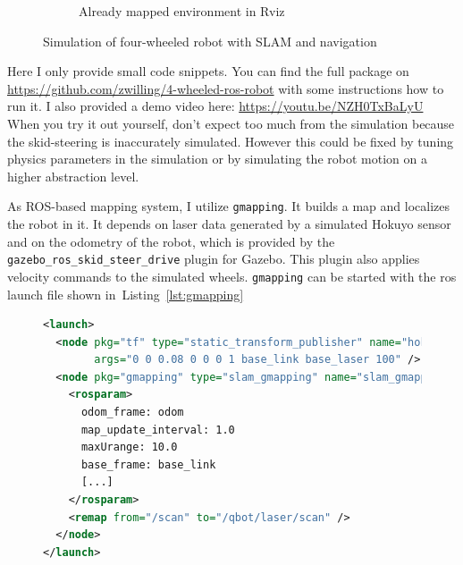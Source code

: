 \documentclass[a4paper,11pt]{article}
\newcommand{\reflst}[1]{Listing~\ref{#1}}
\begin{document}
\begin{figure}
\begin{subfigure}[b]{0.48\textwidth}
    \label{fig:rviz}
    \caption{Already mapped environment in Rviz}
  \end{subfigure}
  \caption{Simulation of four-wheeled robot with SLAM and navigation}
  \label{fig:gaz-rviz}
\end{figure}
Here I only provide small code snippets. You can find the full package
on \url{https://github.com/zwilling/4-wheeled-ros-robot} with some
instructions how to run it. I also provided a demo video
here: \url{https://youtu.be/NZH0TxBaLyU}\\When you try it out yourself, don't expect too much from
the simulation because the skid-steering is
inaccurately simulated. However this could be fixed by tuning physics parameters
in the simulation or by simulating the robot motion on a higher abstraction
level.

As ROS-based mapping system, I utilize \texttt{gmapping}. It builds a map and
localizes the robot in it. It depends on laser data generated by a
simulated Hokuyo sensor and on the odometry of the robot, which is
provided by the \texttt{gazebo\_ros\_skid\_steer\_drive} plugin for
Gazebo. This plugin also applies velocity commands to the simulated
wheels. \texttt{gmapping} can be started with the ros launch file
shown in~\reflst{lst:gmapping}
\begin{figure}
\begin{lstlisting}[showlines,language=XML, caption={Launch file for \texttt{gmapping}},
    label=lst:gmapping]
<launch>
  <node pkg="tf" type="static_transform_publisher" name="hokuyo_link_broadcaster"
        args="0 0 0.08 0 0 0 1 base_link base_laser 100" />
  <node pkg="gmapping" type="slam_gmapping" name="slam_gmapping" output="screen">
    <rosparam>
      odom_frame: odom
      map_update_interval: 1.0
      maxUrange: 10.0
      base_frame: base_link
      [...]
    </rosparam>
    <remap from="/scan" to="/qbot/laser/scan" />
  </node>
</launch>
\end{lstlisting}
\end{figure}
\end{document}
